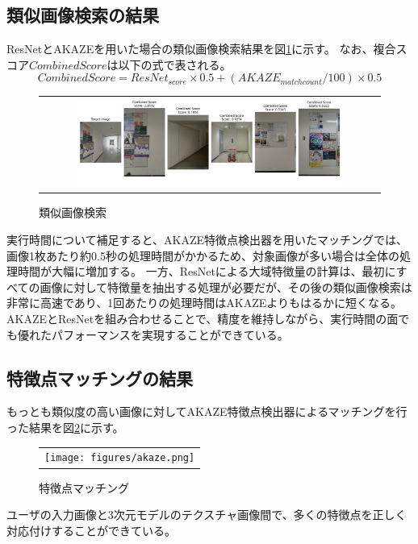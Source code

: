 \documentclass[]{jarticle}          %
\begin{document}
\subsection{類似画像検索の結果}
ResNetとAKAZEを用いた場合の類似画像検索結果を図\ref{six}に示す。
なお、複合スコア$CombinedScore$は以下の式で表される。
\begin{equation}
  CombinedScore = ResNet_{score}\times{0.5}+(AKAZE_{matchcount}/100)\times{0.5}
\end{equation}
\begin{figure}[H]
  \begin{center}
    \begin{tabular}{c}
      \includegraphics[width=0.8\textwidth]{figures/ResNetAKAZE.png}\\
    \end{tabular}
  \end{center}
  \caption{類似画像検索}
  \label{six}
\end{figure}
実行時間について補足すると、AKAZE特徴点検出器を用いたマッチングでは、画像1枚あたり約0.5秒の処理時間がかかるため、対象画像が多い場合は全体の処理時間が大幅に増加する。
一方、ResNetによる大域特徴量の計算は、最初にすべての画像に対して特徴量を抽出する処理が必要だが、その後の類似画像検索は非常に高速であり、1回あたりの処理時間はAKAZEよりもはるかに短くなる。
AKAZEとResNetを組み合わせることで、精度を維持しながら、実行時間の面でも優れたパフォーマンスを実現することができている。

\subsection{特徴点マッチングの結果}
もっとも類似度の高い画像に対してAKAZE特徴点検出器によるマッチングを行った結果を図\ref{seven}に示す。
\begin{figure}[H]
  \begin{center}
    \begin{tabular}{c}
      \texttt{[image: figures/akaze.png]}\\
    \end{tabular}
  \end{center}
  \caption{特徴点マッチング}
  \label{seven}
\end{figure}
ユーザの入力画像と3次元モデルのテクスチャ画像間で、多くの特徴点を正しく対応付けすることができている。
\end{document}
